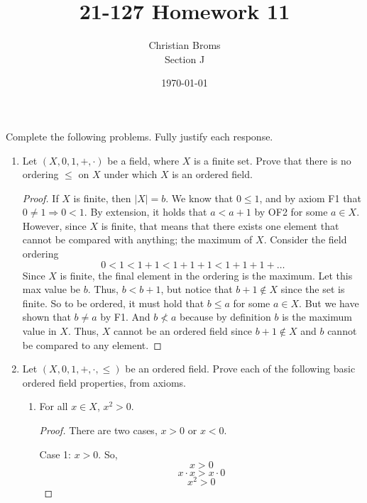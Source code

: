 \documentclass[12pt]{article}
\begin{document}
\title{21-127 Homework 11
}
\author{Christian Broms \\ Section J}
\date{\today}
\maketitle
Complete the following problems. Fully justify each response.


\begin{enumerate}

\item Let $(X, 0, 1, +, \cdot)$ be a field, where $X$ is a finite set. Prove that there is no ordering $\leq$ on $X$ under which $X$ is an ordered field.

\begin{proof}
If $X$ is finite, then $|X| = b$. We know that $0 \leq 1$, and by axiom F1 that $0\neq1 \Rightarrow 0<1$. By extension, it holds that $a < a+1$ by OF2 for some $a \in X$. However, since $X$ is finite, that means that there exists one element that cannot be compared with anything; the maximum of $X$. Consider the field ordering 
$$0 < 1 < 1+1 < 1+1+1< 1+1+1+\ldots$$
Since $X$ is finite, the final element in the ordering is the maximum. Let this max value be $b$. Thus, $b < b+1$, but notice that $b+1 \notin X$ since the set is finite. So to be ordered, it must hold that $b \leq a$ for some $a \in X$. But we have shown that $b\neq a$ by F1. And $b \not< a$ because by definition $b$ is the maximum value in $X$. Thus, $X$ cannot be an ordered field since $b + 1\notin X$ and $b$ cannot be compared to any element. 
\end{proof}

\item Let $(X, 0, 1, +, \cdot, \leq)$ be an ordered field. Prove each of the following basic ordered field properties, from axioms.
\begin{enumerate}
\item For all $x\in X$, $x^2>0$.
\begin{proof}
There are two cases, $x>0$ or $x<0$. 

Case 1: $x>0$. So,
$$x >0$$
$$x \cdot x > x \cdot 0$$
$$x^2 > 0$$


\end{proof}
\end{enumerate}
\end{enumerate}
\end{document}
